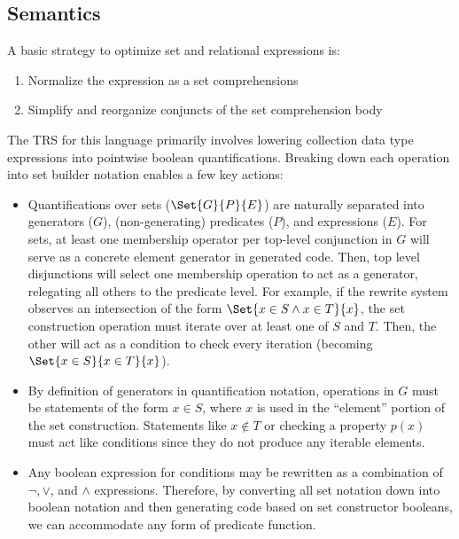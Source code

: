 
\subsection{Semantics}



A basic strategy to optimize set and relational expressions is:
\begin{enumerate}
  \item Normalize the expression as a set comprehensions
  \item Simplify and reorganize conjuncts of the set comprehension body
\end{enumerate}

The TRS for this language primarily involves lowering collection data type expressions into pointwise boolean quantifications. Breaking down each operation into set builder notation enables a few key actions:
\begin{itemize}
  \item Quantifications over sets ($\Set{G}{P}{E}$) are naturally separated into generators ($G$), (non-generating) predicates ($P$), and expressions ($E$). For sets, at least one membership operator per top-level conjunction in $G$ will serve as a concrete element generator in generated code. Then, top level disjunctions will select one membership operation to act as a generator, relegating all others to the predicate level. For example, if the rewrite system observes an intersection of the form $\Set{x \in S \land x \in T}{x}$, the set construction operation must iterate over at least one of $S$ and $T$. Then, the other will act as a condition to check every iteration (becoming $\Set{x \in S}{x \in T}{x}$).
  \item By definition of generators in quantification notation, operations in $G$ must be statements of the form $x \in S$, where $x$ is used in the ``element'' portion of the set construction. Statements like $x \notin T$ or checking a property $p(x)$ must act like conditions since they do not produce any iterable elements.
  \item Any boolean expression for conditions may be rewritten as a combination of $\lnot, \lor$, and $\land$ expressions. Therefore, by converting all set notation down into boolean notation and then generating code based on set constructor booleans, we can accommodate any form of predicate function.
\end{itemize}
